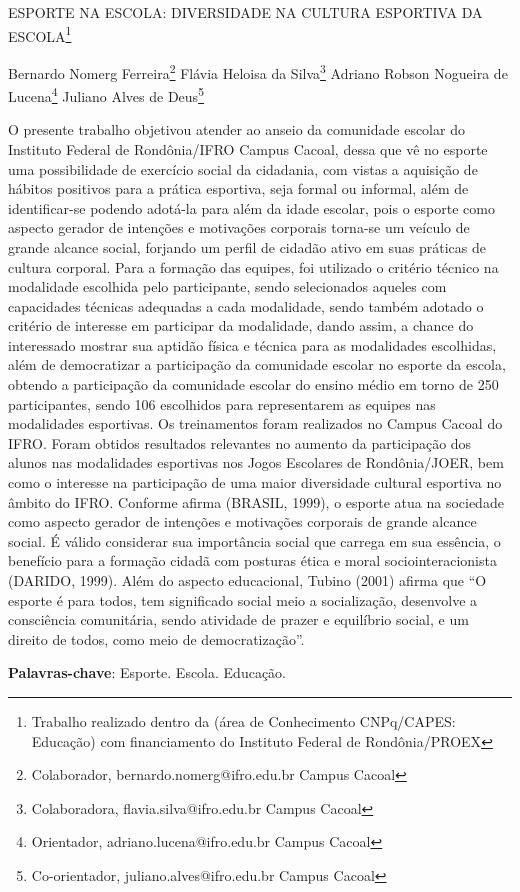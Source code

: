 \documentclass[article,12pt,onesidea,4paper,english,brazil]{abntex2}
\begin{document}
	
	
	\frenchspacing 
	
	\begin{center}
		\LARGE ESPORTE NA ESCOLA: DIVERSIDADE NA CULTURA ESPORTIVA DA ESCOLA\footnote{Trabalho realizado dentro da (área de Conhecimento CNPq/CAPES: Educação) com financiamento do Instituto Federal de Rondônia/PROEX}
		
		\normalsize
		Bernardo Nomerg Ferreira\footnote{Colaborador, bernardo.nomerg@ifro.edu.br  Campus Cacoal} 
		Flávia Heloisa da Silva\footnote{Colaboradora, flavia.silva@ifro.edu.br  Campus Cacoal} 
		Adriano Robson Nogueira de Lucena\footnote{Orientador, adriano.lucena@ifro.edu.br  Campus Cacoal} 
		Juliano Alves de Deus\footnote{Co-orientador, juliano.alves@ifro.edu.br  Campus Cacoal} 
	\end{center}
	
	\noindent O presente trabalho objetivou atender ao anseio da comunidade escolar do Instituto Federal de Rondônia/IFRO Campus Cacoal, dessa que vê no esporte uma possibilidade de exercício social da cidadania, com vistas a aquisição de hábitos positivos para a prática esportiva, seja formal ou informal, além de identificar-se podendo adotá-la para além da idade escolar, pois o esporte como aspecto gerador de intenções e motivações corporais torna-se um veículo de grande alcance social, forjando um perfil de cidadão ativo em suas práticas de cultura corporal. Para a formação das equipes, foi utilizado o critério técnico na modalidade escolhida pelo participante, sendo selecionados aqueles com capacidades técnicas adequadas a cada modalidade, sendo também adotado o critério de interesse em participar da modalidade, dando assim, a chance do interessado mostrar sua aptidão física e técnica para as modalidades escolhidas, além de democratizar a participação da comunidade escolar no esporte da escola, obtendo a participação da comunidade escolar do ensino médio em torno de 250 participantes, sendo 106 escolhidos para representarem as equipes nas modalidades esportivas. Os treinamentos foram realizados no Campus Cacoal do IFRO. Foram obtidos resultados relevantes no aumento da participação dos alunos nas modalidades esportivas nos Jogos Escolares de Rondônia/JOER, bem como o interesse na participação de uma maior diversidade cultural esportiva no âmbito do IFRO. Conforme afirma (BRASIL, 1999), o esporte atua na sociedade como aspecto gerador de intenções e motivações corporais de grande alcance social. É válido considerar sua importância social que carrega em sua essência, o benefício para a formação cidadã com posturas ética e moral sociointeracionista (DARIDO, 1999). Além do aspecto educacional, Tubino (2001) afirma que “O esporte é para todos, tem significado social meio a socialização, desenvolve a consciência comunitária, sendo atividade de prazer e equilíbrio social, e um direito de todos, como meio de democratização”.
	
	\vspace{\onelineskip}
	
	\noindent
	\textbf{Palavras-chave}: Esporte. Escola. Educação.
	
\end{document}
